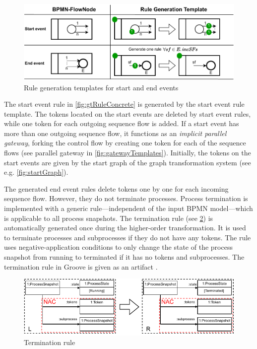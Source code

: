\documentclass[submission, copyright, creativecommons]{eptcs}
\begin{document}
\begin{figure}[h]
    \centering
    \includegraphics[width=.9\textwidth]{images/start_end_template.pdf}
    \caption{Rule generation templates for start and end events}
    \label{fig:startAndEndTemplate}
\end{figure}

The start event rule in \cref{fig:gtRuleConcrete} is generated by the start event rule template.
The tokens located on the start events are deleted by start event rules, while one token for each outgoing sequence flow is added.
If a start event has more than one outgoing sequence flow, it functions as an \textit{implicit parallel gateway}, forking the control flow by creating one token for each of the sequence flows (see parallel gateway in \cref{fig:gatewayTemplates}).
Initially, the tokens on the start events are given by the start graph of the graph transformation system (see e.g. \cref{fig:startGraph}).
    
The generated end event rules delete tokens one by one for each incoming sequence flow.
However, they do not terminate processes.
Process termination is implemented with a generic rule---independent of the input BPMN model---which is applicable to all process snapshots.
The termination rule (see \cref{fig:terminationRule}) is automatically generated once during the higher-order transformation.
It is used to terminate processes and subprocesses if they do not have any tokens.
The rule uses negative-application conditions to only change the state of the process snapshot from running to terminated if it has no tokens and subprocesses.
The termination rule in Groove is given as an artifact \cite{timkrauterArtifactsTERMGRAPH2022}.

\begin{figure}[h]
    \centering
    \includegraphics[width=.8\textwidth]{images/bpmn_semantics-termination_rule.pdf}
    \caption{Termination rule}
    \label{fig:terminationRule}
\end{figure}
\end{document}
